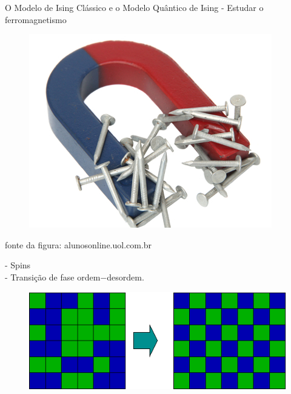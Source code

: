 \documentclass[10pt]{beamer}
\begin{document}
\begin{frame}{O Modelo de Ising Clássico e o Modelo Quântico de Ising}
	- Estudar o ferromagnetismo \\
	\begin{figure}[h]
		\center
		\includegraphics[scale=.25]{ferromag.jpg}
	\end{figure}
	\scriptsize fonte da figura: alunosonline.uol.com.br
	\normalsize
	
	- Spins \\
	- Transição de fase ordem$-$desordem.
	\begin{figure}
		\center
		\includegraphics[scale=.3]{Ordering.png}
	\end{figure}

\end{frame}
\end{document}
